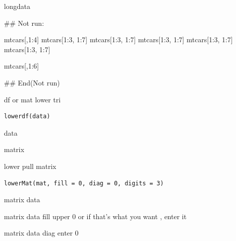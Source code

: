 \documentclass[a4paper]{book}
\begin{document}
%
\begin{Value}
longdata
\end{Value}
%
\begin{Examples}
\begin{ExampleCode}
## Not run: 

mtcars[,1:4] %
mtcars[1:3, 1:7] %
mtcars[1:3, 1:7] %
mtcars[1:3, 1:7] %
mtcars[1:3, 1:7] %
mtcars[1:3, 1:7] %


 mtcars[,1:6] %




## End(Not run)
\end{ExampleCode}
\end{Examples}
%
\begin{Description}
df or mat lower tri
\end{Description}
%
\begin{Usage}
\begin{verbatim}
lowerdf(data)
\end{verbatim}
\end{Usage}
%
\begin{Arguments}
\begin{ldescription}
\item[\code{data}] data
\end{ldescription}
\end{Arguments}
%
\begin{Value}
matrix
\end{Value}
%
\begin{Description}
lower pull matrix
\end{Description}
%
\begin{Usage}
\begin{verbatim}
lowerMat(mat, fill = 0, diag = 0, digits = 3)
\end{verbatim}
\end{Usage}
%
\begin{Arguments}
\begin{ldescription}
\item[\code{mat}] matrix data

\item[\code{fill}] matrix data fill upper 0 or if that's what you want , enter it

\item[\code{diag}] matrix data diag enter 0
\end{ldescription}
\end{Arguments}
\end{document}
